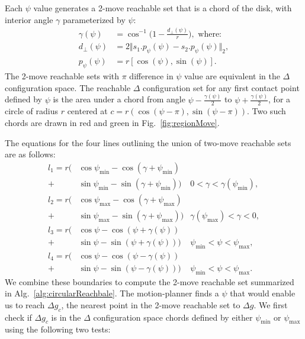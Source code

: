 Each $\psi$ value generates a 2-move reachable set that is a chord of the disk, with interior angle $\gamma$ parameterized by $\psi$:
\begin{align}\label{eq:gamma}
\gamma(\psi) &= \cos^{-1} \Big(1-\frac{d_\perp(\psi)}{r} \Big), \textrm{ where:}\\ \label{eq:dprep}
d_\perp(\psi)&= 2 \Vert s_1.p_\psi(\psi) - s_2.p_\psi(\psi)  \Vert_{\scriptscriptstyle 2},\\ \label{eq:ppsi}
p_\psi(\psi) &= r[\cos(\psi ), \sin(\psi )].
\end{align} 
The 2-move reachable sets with $\pi$ difference in $\psi$ value are equivalent in the  $\Delta$ configuration space. 
The reachable $\Delta$ configuration set for any first contact point defined by $\psi$ is the area under a chord from angle $\psi- \frac{\gamma(\psi)}{2}$ to $\psi+ \frac{\gamma(\psi)}{2}$, for a circle of radius $r$ centered at $c = r(\cos(\psi-\pi), \sin(\psi-\pi))$. Two such chords are drawn in red and green in Fig.~\ref{fig:regionMove}.

The equations for the four lines outlining the union of  two-move reachable sets are as follows:
\begin{align}\label{eq:circlereachable}
l_1 =  r \Big(&\cos\psi_{\min}- \cos(\gamma + \psi_{\min} )\\ \nonumber
 + &\sin\psi_{\min}- \sin(\gamma + \psi_{\min})\Big) &  0<\gamma< \gamma(\psi_{\min}),\\ \nonumber
l_2 =  r \Big(&\cos\psi_{\max}- \cos(\gamma + \psi_{\max})\\ \nonumber
 + &\sin\psi_{\max}- \sin(\gamma + \psi_{\max})\Big) &  \gamma(\psi_{\max})<\gamma< 0,\\  \nonumber
l_3 =  r \Big(&\cos\psi- \cos( \psi+\gamma(\psi) )\\ \nonumber
+ & \sin\psi-\sin( \psi+ \gamma(\psi))\Big) &  \psi_{\min}<\psi< \psi_{\max},\\ \nonumber
l_4 =  r \Big(&\cos\psi- \cos( \psi-\gamma(\psi) )\\ \nonumber
+ &  \sin\psi- \sin( \psi- \gamma(\psi))\Big) &  \psi_{\min}<\psi< \psi_{\max}. \nonumber
\end{align}
We combine these boundaries to compute the 2-move reachable set summarized in Alg.~\ref{alg:circularReachbale}.
The  motion-planner finds a $\psi$ that would enable us to reach $\Delta g_c$, the nearest point in the 2-move reachable set to $\Delta g$. %
We first check if $\Delta g_c$ is in the $\Delta$ configuration space chords defined by either $\psi_{\min}$ or $\psi_{\max}$ using the following two tests: 

